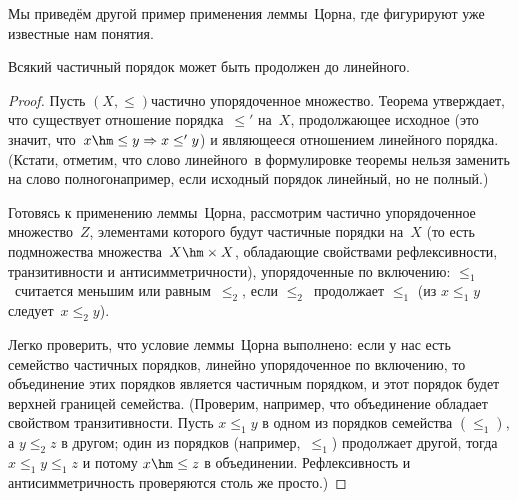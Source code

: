 Мы приведём другой пример применения леммы~Цорна, где
фигурируют уже известные нам понятия.

\begin{theorem}
        \label{partial-to-linear}%
Всякий частичный порядок может быть продолжен до
линейного.
\end{theorem}

\begin{proof}
Пусть $(X,\le)$\т частично упорядоченное множество. Теорема
утверждает, что существует отношение порядка~$\le'$ на~$X$,
продолжающее исходное (это значит, что~$x\hm\le y\Rightarrow x \le'
y$) и являющееся отношением линейного порядка. (Кстати,
отметим, что слово  линейного\ в формулировке теоремы
нельзя заменить на слово  полного\т например, если исходный
порядок линейный, но не полный.)

Готовясь к применению леммы~Цорна, рассмотрим частично
упорядоченное множество~$Z$, элементами которого будут частичные
порядки на~$X$ (то есть подмножества множества~$X\hm\times X$, обладающие
свойствами рефлексивности, транзитивности и антисимметричности),
упорядоченные по включению: $\le_1$~считается меньшим или
равным~$\le_2$, если $\le_2$~продолжает $\le_1$ (из $x\le_1 y$
следует~$x\le_2 y$).

Легко проверить, что условие леммы~Цорна выполнено: если
у нас есть семейство частичных порядков, линейно упорядоченное
по включению, то объединение этих порядков является частичным
порядком, и этот порядок будет верхней границей семейства.
(Проверим, например, что объединение обладает свойством
транзитивности. Пусть $x\le_1 y$ в одном из порядков семейства $(\le_1)$,
а $y\le_2 z$ в другом; один из порядков (например,~$\le_1$) продолжает
другой, тогда $x\le_1 y \le_1 z$ и потому $x\hm\le z$ в объединении.
Рефлексивность и антисимметричность проверяются столь же просто.)


\end{proof}
